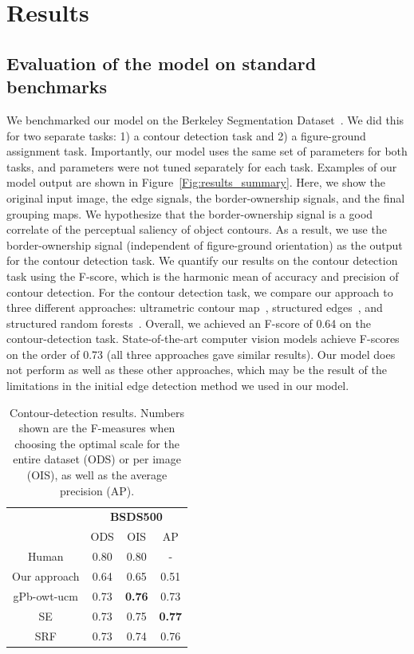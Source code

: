 \documentclass[12pt]{article}
\begin{document}
\section{Results}
\label{sec:results}

\subsection{Evaluation of the model on standard benchmarks}
We benchmarked our model on the Berkeley Segmentation Dataset~\citep{Martin_etal01}. We did this for two separate tasks: 1) a contour detection task and 2) a figure-ground assignment task. Importantly, our model uses the same set of parameters for both tasks, and parameters were not tuned separately for each task. Examples of our model output are shown in Figure~\ref{Fig:results_summary}. Here, we show the original input image, the edge signals, the border-ownership signals, and the final grouping maps. We hypothesize that the border-ownership signal is a good correlate of the perceptual saliency of object contours. As a result, we use the border-ownership signal (independent of figure-ground orientation) as the output for the contour detection task. We quantify our results on the contour detection task using the F-score, which is the harmonic mean of accuracy and precision of contour detection. For the contour detection task, we compare our approach to three different approaches: ultrametric contour map~\citep[][gPb-owt-ucm]{Arbeleaz_etal11}, structured edges~\citep[][SE]{Dollar_Zitnick15}, and structured random forests~\citep[][SRF]{Teo_etal15}. Overall, we achieved an F-score of 0.64 on the contour-detection task. State-of-the-art computer vision models achieve F-scores on the order of 0.73 (all three approaches gave similar results). Our model does not perform as well as these other approaches, which may be the result of the limitations in the initial edge detection method we used in our model.

\begin{table}[h!]
\centering
\begin{tabular}{|c|c|c|c| } 
 \cline{2-4}
 \multicolumn{1}{c}{} & \multicolumn{3}{|c|}{\textbf{BSDS500}} \\
 \cline{2-4}
 \multicolumn{1}{c|}{} & ODS & OIS & AP\\ 
 \hline
 Human & 0.80 & 0.80 & -\\ 
 \hline
  Our approach & 0.64 & 0.65 & 0.51 \\
 gPb-owt-ucm & 0.73 & \textbf{0.76} & 0.73 \\
 SE & 0.73 & 0.75 & \textbf{0.77} \\
 SRF & 0.73 & 0.74 & 0.76 \\
 \hline
\end{tabular}
\caption{Contour-detection results. Numbers shown are the F-measures when choosing the optimal scale for the entire dataset (ODS) or per image (OIS), as well as the average precision (AP).}
\label{tbl:Table1}
\end{table}
\end{document}
